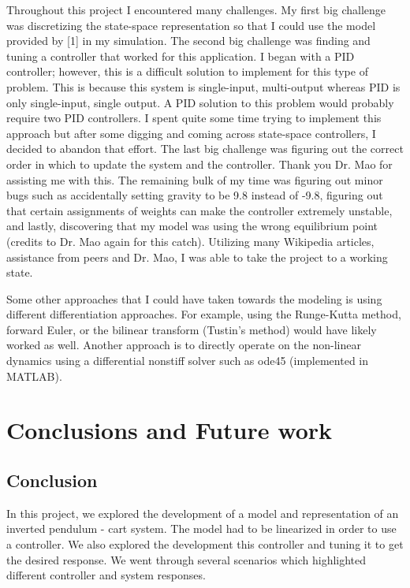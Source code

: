 \documentclass{article}
\begin{document}
Throughout this project I encountered many challenges. My first big challenge was discretizing the state-space representation so that I could use the model provided by [1] in my simulation. The second big challenge was finding and tuning a controller that worked for this application. I began with a PID controller; however, this is a difficult solution to implement for this type of problem. This is because this system is single-input, multi-output whereas PID is only single-input, single output. A PID solution to this problem would probably require two PID controllers. I spent quite some time trying to implement this approach but after some digging and coming across state-space controllers, I decided to abandon that effort. The last big challenge was figuring out the correct order in which to update the system and the controller. Thank you Dr. Mao for assisting me with this. The remaining bulk of my time was figuring out minor bugs such as accidentally setting gravity to be 9.8 instead of -9.8, figuring out that certain assignments of weights can make the controller extremely unstable, and lastly, discovering that my model was using the wrong equilibrium point (credits to Dr. Mao again for this catch). Utilizing many Wikipedia articles, assistance from peers and Dr. Mao, I was able to take the project to a working state.

Some other approaches that I could have taken towards the modeling is using different differentiation approaches. For example, using the Runge-Kutta method, forward Euler, or the bilinear transform (Tustin's method) would have likely worked as well. Another approach is to directly operate on the non-linear dynamics using a differential nonstiff solver such as ode45 (implemented in MATLAB).

\section{Conclusions and Future work}
\subsection{Conclusion}

In this project, we explored the development of a model and representation of an inverted pendulum - cart system. The model had to be linearized in order to use a controller. We also explored the development this controller and tuning it to get the desired response. We went through several scenarios which highlighted different controller and system responses.
\end{document}
